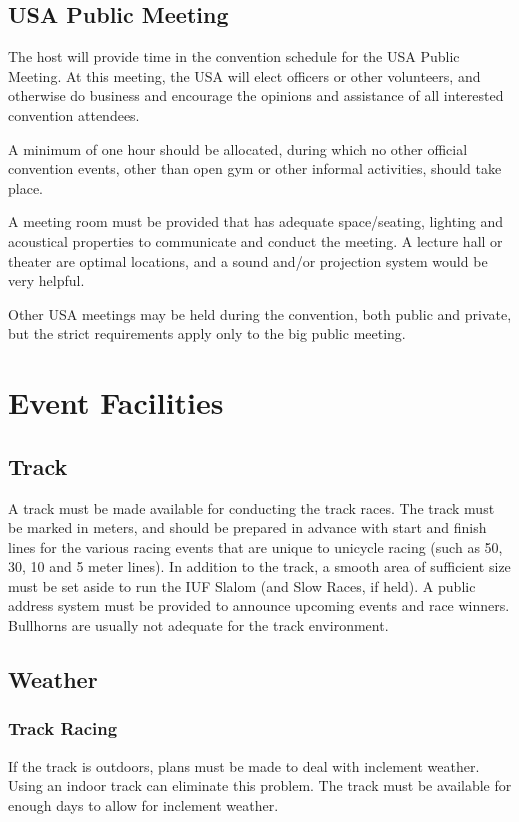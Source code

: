 \section{USA Public Meeting}
The host will provide time in the convention schedule for the USA Public Meeting.
At this meeting, the USA will elect officers or other volunteers, and otherwise do business and encourage the opinions and assistance of all interested convention attendees.

A minimum of one hour should be allocated, during which no other official convention events, other than open gym or other informal activities, should take place.

A meeting room must be provided that has adequate space/seating, lighting and acoustical properties to communicate and conduct the meeting.
A lecture hall or theater are optimal locations, and a sound and/or projection system would be very helpful.

Other USA meetings may be held during the convention, both public and private, but the strict requirements apply only to the big public meeting.

\chapter{Event Facilities}
\section{Track}
A track must be made available for conducting the track races.
The track must be marked in meters, and should be prepared in advance with start and finish lines for the various racing events that are unique to unicycle racing (such as 50, 30, 10 and 5 meter lines).
In addition to the track, a smooth area of sufficient size must be set aside to run the IUF Slalom (and Slow Races, if held).
A public address system must be provided to announce upcoming events and race winners.
Bullhorns are usually not adequate for the track environment.

\section{Weather}

\subsection{Track Racing}
If the track is outdoors, plans must be made to deal with inclement weather.
Using an indoor track can eliminate this problem.
The track must be available for enough days to allow for inclement weather.

